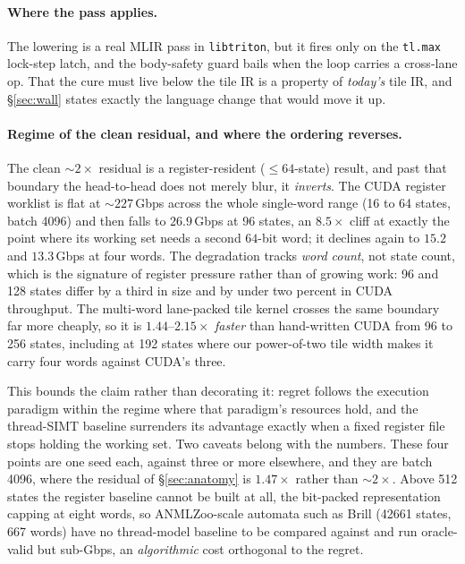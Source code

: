 \documentclass[sigplan,screen,review,anonymous]{acmart}
\begin{document}
\paragraph{Where the pass applies.} The lowering is a real MLIR pass in \texttt{libtriton},
but it fires only on the \texttt{tl.max} lock-step latch, and the body-safety guard bails
when the loop carries a cross-lane op. That the cure must live below the tile IR is a
property of \emph{today's} tile IR, and \S\ref{sec:wall} states exactly the language change
that would move it up.

\paragraph{Regime of the clean residual, and where the ordering reverses.} The clean
${\sim}2\times$ residual is a register-resident ($\le 64$-state) result, and past that
boundary the head-to-head does not merely blur, it \emph{inverts}. The CUDA register
worklist is flat at ${\sim}227$\,Gbps across the whole single-word range (16 to 64 states,
batch 4096) and then falls to $26.9$\,Gbps at 96 states, an $8.5\times$ cliff at exactly the
point where its working set needs a second $64$-bit word; it declines again to $15.2$ and
$13.3$\,Gbps at four words. The degradation tracks \emph{word count}, not state count,
which is the signature of register pressure rather than of growing work: 96 and 128 states
differ by a third in size and by under two percent in CUDA throughput. The
multi-word lane-packed tile kernel crosses the same boundary far more cheaply, so it is
$1.44$--$2.15\times$ \emph{faster} than hand-written CUDA from 96 to 256 states, including
at 192 states where our power-of-two tile width makes it carry four words against CUDA's
three.

This bounds the claim rather than decorating it: regret follows the execution paradigm
within the regime where that paradigm's resources hold, and the thread-SIMT baseline
surrenders its advantage exactly when a fixed register file stops holding the working set.
Two caveats belong with the numbers. These four points are one seed each, against three or
more elsewhere, and they are batch 4096, where the residual of \S\ref{sec:anatomy} is
$1.47\times$ rather than ${\sim}2\times$. Above 512 states the register baseline cannot be
built at all, the bit-packed representation capping at eight words, so ANMLZoo-scale
automata such as Brill (42661 states, 667 words) have no thread-model baseline to be
compared against and run oracle-valid but sub-Gbps, an \emph{algorithmic} cost orthogonal
to the regret.
\end{document}
